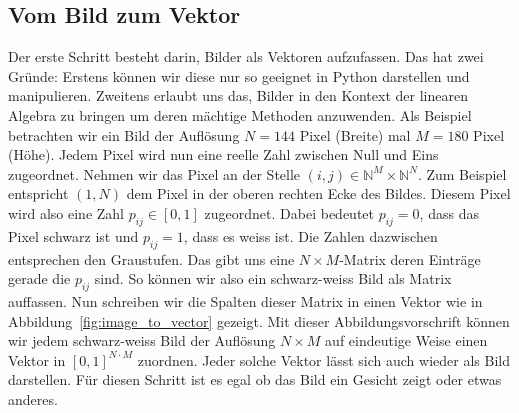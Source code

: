 \subsection{Vom Bild zum Vektor}
Der erste Schritt besteht darin, Bilder als Vektoren aufzufassen.
Das hat zwei Gründe: Erstens können wir diese nur so geeignet in Python darstellen und manipulieren.
Zweitens erlaubt uns das, Bilder in den Kontext der linearen Algebra zu bringen um deren mächtige Methoden anzuwenden.
Als Beispiel betrachten wir ein Bild der Auflösung $N=144$ Pixel (Breite) mal $M=180$ Pixel (Höhe).
Jedem Pixel wird nun eine reelle Zahl zwischen Null und Eins zugeordnet.
Nehmen wir das Pixel an der Stelle $\left(i,j\right)\in\mathbb N^M\times\mathbb N^N$.
Zum Beispiel entspricht $\left(1,N\right)$ dem Pixel in der oberen rechten Ecke des Bildes.
Diesem Pixel wird also eine Zahl $p_{ij}\in\left[0,1\right]$ zugeordnet.
Dabei bedeutet $p_{ij}=0$, dass das Pixel schwarz ist und $p_{ij}=1$, dass es weiss ist.
Die Zahlen dazwischen entsprechen den Graustufen.
Das gibt uns eine $N\times M$-Matrix deren Einträge gerade die $p_{ij}$ sind.
So können wir also ein schwarz-weiss Bild als Matrix auffassen.
Nun schreiben wir die Spalten dieser Matrix in einen Vektor wie in Abbildung~\ref{fig:image_to_vector} gezeigt.
Mit dieser Abbildungsvorschrift können wir jedem schwarz-weiss Bild der Auflösung $N\times M$ auf eindeutige Weise einen Vektor in $\left[0,1\right]^{N\cdot M}$ zuordnen.
Jeder solche Vektor lässt sich auch wieder als Bild darstellen.
Für diesen Schritt ist es egal ob das Bild ein Gesicht zeigt oder etwas anderes.
